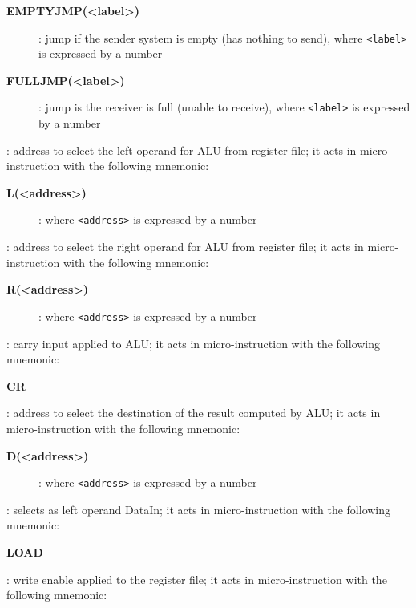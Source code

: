 \begin{description}
\begin{description}
        \item[{\bf EMPTYJMP(<label>)}]: jump if the sender system is empty (has nothing to send), where {\tt <label>} is expressed by a number
        \item[{\bf FULLJMP(<label>)}]: jump is the receiver is full (unable to receive), where {\tt <label>} is expressed by a number
    \end{description}
    \item[{\tt leftAddr[4:0]}]: address to select the left operand for ALU from register file; it acts in micro-instruction with the following mnemonic:
        \begin{description}
            \item[{\bf L(<address>)}]: where {\tt <address>} is expressed by a number
        \end{description}
    \item[{\tt rightAddr[4:0]}]: address to select the right operand for ALU from register file; it acts in micro-instruction with the following mnemonic:
        \begin{description}
            \item[{\bf R(<address>)}]: where {\tt <address>} is expressed by a number
        \end{description}
    \item[{\tt crIn}]: carry input applied to ALU; it acts in micro-instruction with the following mnemonic:
        \begin{description}
            \item[{\bf CR}]
        \end{description}
    \item[{\tt destAddr[4:0]}]: address to select the destination of the result computed by ALU; it acts in micro-instruction with the following mnemonic:
        \begin{description}
            \item[{\bf D(<address>)}]: where {\tt <address>} is expressed by a number
        \end{description}
    \item[{\tt load}]: selects as left operand DataIn; it acts in micro-instruction with the following mnemonic:
        \begin{description}
            \item[{\bf LOAD}]
        \end{description}
    \item[{\tt we}]: write enable applied to the register file; it acts in micro-instruction with the following mnemonic:

\end{description}
